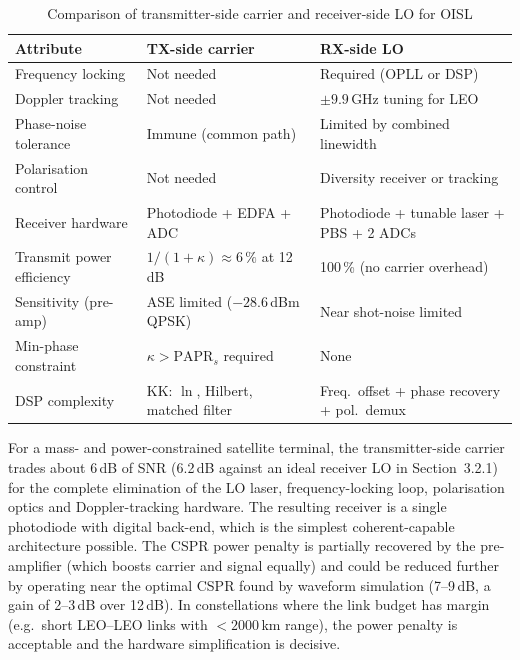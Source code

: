 \begin{table}[h]
\centering
\caption{Comparison of transmitter-side carrier and receiver-side LO for OISL}
\begin{tabular}{|p{4.0cm}|p{5.0cm}|p{5.0cm}|}
\hline
\textbf{Attribute} & \textbf{TX-side carrier} & \textbf{RX-side LO}\\\hline
Frequency locking & Not needed & Required (OPLL or DSP)\\\hline
Doppler tracking & Not needed & $\pm9.9$\,GHz tuning for LEO\\\hline
Phase-noise tolerance & Immune (common path) & Limited by combined linewidth\\\hline
Polarisation control & Not needed & Diversity receiver or tracking\\\hline
Receiver hardware & Photodiode + EDFA + ADC & Photodiode + tunable laser + PBS + 2 ADCs\\\hline
Transmit power efficiency & $1/(1+\kappa)\approx6\,\%$ at 12\,dB & 100\,\% (no carrier overhead)\\\hline
Sensitivity (pre-amp) & ASE limited ($-28.6$\,dBm QPSK) & Near shot-noise limited\\\hline
Min-phase constraint & $\kappa>\mathrm{PAPR}_s$ required & None\\\hline
DSP complexity & KK: $\ln$, Hilbert, matched filter & Freq.\ offset + phase recovery + pol.\ demux\\\hline
\end{tabular}
\end{table}

For a mass- and power-constrained satellite terminal, the transmitter-side carrier trades about 6\,dB of SNR (6.2\,dB against an ideal receiver LO in Section~3.2.1) for the complete elimination of the LO laser, frequency-locking loop, polarisation optics and Doppler-tracking hardware. The resulting receiver is a single photodiode with digital back-end, which is the simplest coherent-capable architecture possible. The CSPR power penalty is partially recovered by the pre-amplifier (which boosts carrier and signal equally) and could be reduced further by operating near the optimal CSPR found by waveform simulation (7--9\,dB, a gain of 2--3\,dB over 12\,dB). In constellations where the link budget has margin (e.g.\ short LEO--LEO links with $<2000$\,km range), the power penalty is acceptable and the hardware simplification is decisive.
